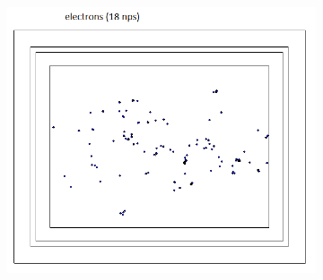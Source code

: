 \documentclass{mc2015}
\begin{document}
\begin{figure}[H]
\begin{subfigure}[b]{0.2\textwidth}
                \label{fig:mcnp_dist_ph}
        \end{subfigure}
        \begin{subfigure}[b]{0.2\textwidth}
                \includegraphics[width=\textwidth]{figures/fig_mcnp_dist_e.png}
                \label{fig:mcnp_dist_e}
        \end{subfigure}
        

\end{figure}
\end{document}

